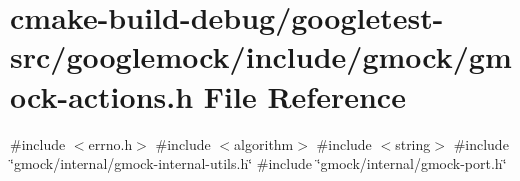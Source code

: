 \hypertarget{gmock-actions_8h}{}\section{cmake-\/build-\/debug/googletest-\/src/googlemock/include/gmock/gmock-\/actions.h File Reference}
\label{gmock-actions_8h}
{\ttfamily \#include $<$errno.\+h$>$}\newline
{\ttfamily \#include $<$algorithm$>$}\newline
{\ttfamily \#include $<$string$>$}\newline
{\ttfamily \#include \char`\"{}gmock/internal/gmock-\/internal-\/utils.\+h\char`\"{}}\newline
{\ttfamily \#include \char`\"{}gmock/internal/gmock-\/port.\+h\char`\"{}}\newline
